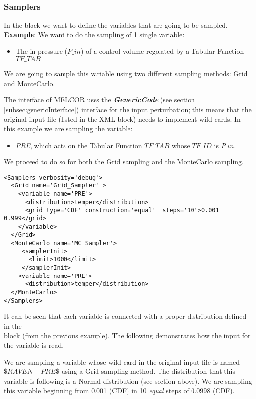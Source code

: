 \subsubsection{Samplers}
In the  block we want to define the variables that are going
to be sampled.
%
\textbf{Example}:
We want to do the sampling of 1 single variable:
\begin{itemize}
  \item The in pressure ($P\_in$) of a control volume regolated by a Tabular Function $TF\_TAB$
\end{itemize}

We are going to sample this variable using two different sampling methods:
Grid and MonteCarlo.

The interface of MELCOR uses the \textbf{\textit{GenericCode}} (see section \ref{subsec:genericInterface})
interface for the input perturbation; this means that the original input file (listed in the  XML block)
needs to implement wild-cards.
%
In this example we are sampling the variable:
\begin{itemize}
  \item \textit{PRE}, which acts on the Tabular Function $TF\_TAB$ whose $TF\_ID $ is $P\_in$.
\end{itemize}

We proceed to do so for both the Grid sampling and the MonteCarlo sampling.

\begin{lstlisting}[style=XML,morekeywords={name,type,construction,lowerBound,steps,limit,initialSeed}]
<Samplers verbosity='debug'>
  <Grid name='Grid_Sampler' >
    <variable name='PRE'>
      <distribution>temper</distribution>
      <grid type='CDF' construction='equal'  steps='10'>0.001 0.999</grid>
    </variable>
  </Grid>
  <MonteCarlo name='MC_Sampler'>
     <samplerInit>
       <limit>1000</limit>
     </samplerInit>
    <variable name='PRE'>
      <distribution>temper</distribution>
  </MonteCarlo>
</Samplers>
\end{lstlisting}

It can be seen that each variable is connected with a proper distribution
defined in the \\ block (from the previous example).
%
The following demonstrates how the input for the variable is read.

We are sampling a variable whose wild-card in the original input file is named $\$RAVEN-PRE\$$
using a Grid sampling method.
%
The distribution that this variable is following is a Normal distribution
(see section above).
%
We are sampling this variable beginning from 0.001 (CDF) in 10 \textit{equal} steps of
0.0998 (CDF).
%
